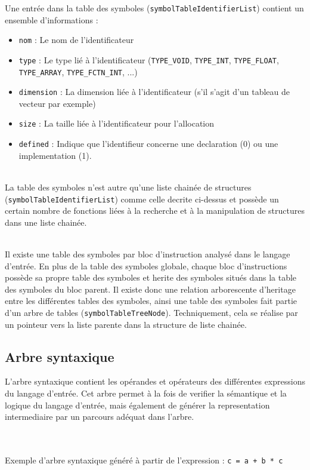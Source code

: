 Une entrée dans la table des symboles (\verb?symbolTableIdentifierList?) contient un ensemble d'informations :

\begin{itemize}
\item \verb?nom? : Le nom de l'identificateur
\item \verb?type? : Le type lié à l'identificateur (\verb?TYPE_VOID?, \verb?TYPE_INT?, \verb?TYPE_FLOAT?, \verb?TYPE_ARRAY?, \verb?TYPE_FCTN_INT?, ...)
\item \verb?dimension? : La dimension liée à l'identificateur (s'il s'agit d'un tableau de vecteur par exemple)
\item \verb?size? : La taille liée à l'identificateur pour l'allocation
\item \verb?defined? : Indique que l'identifieur concerne une declaration (0) ou une implementation (1).
\end{itemize}

~~\\
La table des symboles n'est autre qu'une liste chainée de structures\\ (\verb?symbolTableIdentifierList?) comme celle decrite ci-dessus et possède un certain nombre de fonctions liées à la recherche et à la manipulation de structures dans une liste chainée.

~~\\
Il existe une table des symboles par bloc d'instruction analysé dans le langage d'entrée. En plus de la table des symboles globale, chaque bloc d'instructions possède sa propre table des symboles et herite des symboles situés dans la table des symboles du bloc parent. Il existe donc une relation arborescente d'heritage entre les différentes tables des symboles, ainsi une table des symboles fait partie d'un arbre de tables (\verb?symbolTableTreeNode?). Techniquement, cela se réalise par un pointeur vers la liste parente dans la structure de liste chainée.

\subsection{Arbre syntaxique}

L'arbre syntaxique contient les opérandes et opérateurs des différentes expressions du langage d'entrée. Cet arbre permet à la fois de verifier la sémantique et la logique du langage d'entrée, mais également de générer la representation intermediaire par un parcours adéquat dans l'arbre.

~~\\
~~\\
Exemple d'arbre syntaxique généré à partir de l'expression : \verb?c = a + b * c?
\begin{center}
\end{center}

